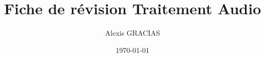 \documentclass[12pt,french]{report}
\title{\Huge Fiche de révision Traitement Audio}
\author{\LARGE Alexis GRACIAS}
\date{\Large \today}
\begin{document}
\maketitle
\large \tableofcontents

\normalsize






\end{document}
